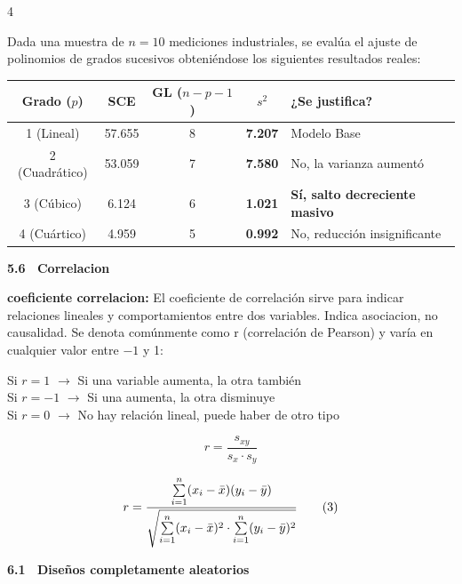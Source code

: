 \documentclass[10pt,a4paper,landscape]{article}
\newcommand{\chico}{\fontsize{4.2}{4.6}\selectfont}
\newif\ifprimeraunidad\primeraunidadtrue
\newcommand{\unidad}[1]{%
  \ifprimeraunidad
    \primeraunidadfalse
  \else
    \par\vspace{3pt}%
    \noindent\rule{\linewidth}{1.3pt}%
    \par\vspace{2pt}%
  \fi}
\newcommand{\tema}[1]{%
  \par\vspace{2pt}%
  \noindent\colorbox{black!16}{\parbox{\dimexpr\linewidth-2\fboxsep\relax}{%
    \fontsize{5.7}{6.6}\selectfont\bfseries #1\strut}}%
  \par\vspace{0.8pt}}
\newcommand{\ej}[1]{\par\vspace{0.8pt}\noindent{\fontsize{5.3}{6.1}\selectfont\bfseries\itshape #1}\par\vspace{0.4pt}}
\let\origsum\sum
\renewcommand{\sum}{\mathop{\textstyle\origsum}\limits}
\begin{document}
\begin{multicols}{4}
\ej{Ej:} Dada una muestra de $n=10$ mediciones industriales, se evalúa el ajuste de polinomios de grados sucesivos obteniéndose los siguientes resultados reales:
\begin{center}
{\chico
\begin{tabular}{@{}c c c c p{9em}@{}}
\toprule
\textbf{Grado ($p$)} & \textbf{SCE} & \textbf{GL ($n{-}p{-}1$)} & \textbf{$s^2$} & \textbf{¿Se justifica?} \\
\midrule
1 (Lineal) & 57.655 & 8 & \textbf{7.207} & Modelo Base \\
2 (Cuadrático) & 53.059 & 7 & \textbf{7.580} & No, la varianza aumentó \\
3 (Cúbico) & 6.124 & 6 & \textbf{1.021} & \textbf{Sí, salto decreciente masivo} \\
4 (Cuártico) & 4.959 & 5 & \textbf{0.992} & No, reducción insignificante \\
\bottomrule
\end{tabular}
}
\end{center}

\tema{5.6 \ Correlacion}

\textbf{coeficiente correlacion:} El coeficiente de correlación sirve para indicar relaciones lineales y comportamientos entre dos variables. Indica asociacion, no causalidad. Se denota comúnmente como r (correlación de Pearson) y varía en cualquier valor entre $-1$ y 1:

Si $r = 1$ $\rightarrow$ Si una variable aumenta, la otra también\\
Si $r = -1$ $\rightarrow$ Si una aumenta, la otra disminuye\\
Si $r = 0$ $\rightarrow$ No hay relación lineal, puede haber de otro tipo

\begin{minipage}[c]{0.26\linewidth}
\[
r = \frac{s_{xy}}{s_x \cdot s_y} \tag{2}
\]
\end{minipage}\hfill
\begin{minipage}[c]{0.71\linewidth}
\[
{\chico r = \frac{\sum_{i=1}^{n} (x_i - \bar{x})(y_i - \bar{y})}{\sqrt{\sum_{i=1}^{n}(x_i-\bar{x})^2 \cdot \sum_{i=1}^{n}(y_i-\bar{y})^2}}} \tag{3}
\]
\end{minipage}

\unidad{UNIDAD 6 --- ANÁLISIS DE VARIANZA (ANOVA)}

\tema{6.1 \ Diseños completamente aleatorios}


\end{multicols}
\end{document}
